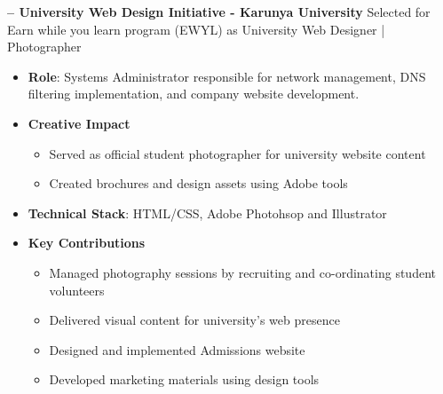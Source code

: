 \begin{sectionContainer}
	\vspace{0.4em}\noindent\large\textbf{– University Web Design Initiative - Karunya University}
	\vspace{0.8em} \newline
	Selected for Earn while you learn program (EWYL)  as University Web Designer | Photographer
	\begin{itemize}[leftmargin=*, nosep, itemsep=0.4em, before=\vspace{0.6em}, after=\vspace{0.8em}, label={}]
		\item \textbf{Role}: Systems Administrator responsible for network management, DNS filtering implementation, and company website development.
		\item \textbf{Creative Impact}
		\begin{itemize}
			\item Served as official student photographer for university website content
			\item Created brochures and design assets using Adobe tools
		\end{itemize}
		\item \textbf{Technical Stack}: HTML/CSS, Adobe Photohsop and Illustrator
		\item \textbf{Key Contributions}
		\begin{itemize}
			\item Managed photography sessions by recruiting and co-ordinating student volunteers
			\item Delivered visual content for university's web presence
			\item Designed and implemented Admissions website
			\item Developed marketing materials using design tools
		\end{itemize}
	\end{itemize}
\end{sectionContainer}
\nopagebreak[4]